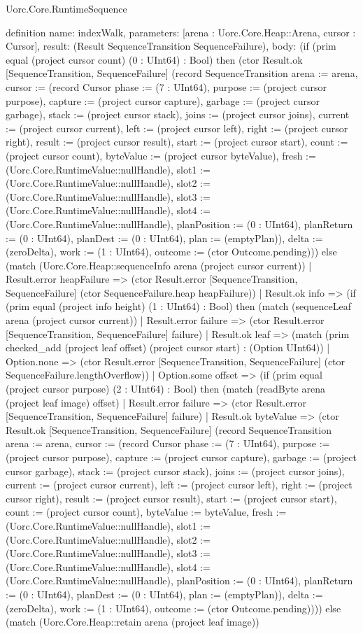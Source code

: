 \begin{lexlean}{Uorc.Core.RuntimeSequence}
\begin{semanticmodule}
definition{
  name: indexWalk,
  parameters: [arena : Uorc.Core.Heap::Arena, cursor : Cursor],
  result: (Result SequenceTransition SequenceFailure),
  body: (if (prim equal (project cursor count) (0 : UInt64) : Bool) then (ctor Result.ok [SequenceTransition, SequenceFailure] (record SequenceTransition {arena := arena, cursor := (record Cursor {phase := (7 : UInt64), purpose := (project cursor purpose), capture := (project cursor capture), garbage := (project cursor garbage), stack := (project cursor stack), joins := (project cursor joins), current := (project cursor current), left := (project cursor left), right := (project cursor right), result := (project cursor result), start := (project cursor start), count := (project cursor count), byteValue := (project cursor byteValue), fresh := (Uorc.Core.RuntimeValue::nullHandle), slot1 := (Uorc.Core.RuntimeValue::nullHandle), slot2 := (Uorc.Core.RuntimeValue::nullHandle), slot3 := (Uorc.Core.RuntimeValue::nullHandle), slot4 := (Uorc.Core.RuntimeValue::nullHandle), planPosition := (0 : UInt64), planReturn := (0 : UInt64), planDest := (0 : UInt64), plan := (emptyPlan)}), delta := (zeroDelta), work := (1 : UInt64), outcome := (ctor Outcome.pending)})) else (match (Uorc.Core.Heap::sequenceInfo arena (project cursor current))
    | Result.error heapFailure => (ctor Result.error [SequenceTransition, SequenceFailure] (ctor SequenceFailure.heap heapFailure))
    | Result.ok info => (if (prim equal (project info height) (1 : UInt64) : Bool) then (match (sequenceLeaf arena (project cursor current))
      | Result.error failure => (ctor Result.error [SequenceTransition, SequenceFailure] failure)
      | Result.ok leaf => (match (prim checked_add (project leaf offset) (project cursor start) : (Option UInt64))
        | Option.none => (ctor Result.error [SequenceTransition, SequenceFailure] (ctor SequenceFailure.lengthOverflow))
        | Option.some offset => (if (prim equal (project cursor purpose) (2 : UInt64) : Bool) then (match (readByte arena (project leaf image) offset)
          | Result.error failure => (ctor Result.error [SequenceTransition, SequenceFailure] failure)
          | Result.ok byteValue => (ctor Result.ok [SequenceTransition, SequenceFailure] (record SequenceTransition {arena := arena, cursor := (record Cursor {phase := (7 : UInt64), purpose := (project cursor purpose), capture := (project cursor capture), garbage := (project cursor garbage), stack := (project cursor stack), joins := (project cursor joins), current := (project cursor current), left := (project cursor left), right := (project cursor right), result := (project cursor result), start := (project cursor start), count := (project cursor count), byteValue := byteValue, fresh := (Uorc.Core.RuntimeValue::nullHandle), slot1 := (Uorc.Core.RuntimeValue::nullHandle), slot2 := (Uorc.Core.RuntimeValue::nullHandle), slot3 := (Uorc.Core.RuntimeValue::nullHandle), slot4 := (Uorc.Core.RuntimeValue::nullHandle), planPosition := (0 : UInt64), planReturn := (0 : UInt64), planDest := (0 : UInt64), plan := (emptyPlan)}), delta := (zeroDelta), work := (1 : UInt64), outcome := (ctor Outcome.pending)}))) else (match (Uorc.Core.Heap::retain arena (project leaf image))
}
\end{semanticmodule}
\end{lexlean}
